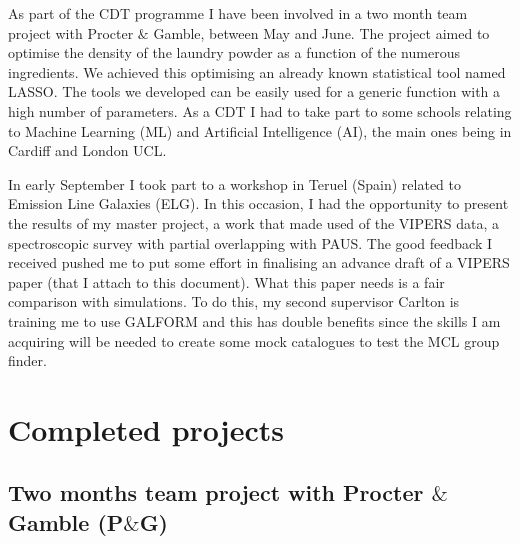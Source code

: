 \documentclass[letterpaper]{article}
\begin{document}
As part of the CDT programme I have been involved in a two month team project with Procter $\&$ Gamble, between May and June. The project aimed to optimise the density of the laundry powder as a function of the numerous ingredients. We achieved this optimising an already known statistical tool named LASSO. The tools we developed can be easily used for a generic function with a high number of parameters. As a CDT I had to take part to some schools relating to Machine Learning (ML) and Artificial Intelligence (AI), the main ones being in Cardiff and London UCL.

In early September I took part to a workshop in Teruel (Spain) related to Emission Line Galaxies (ELG). In this occasion, I had the opportunity to present the results of my master project, a work that made used of the VIPERS data, a spectroscopic survey with partial overlapping with PAUS. The good feedback I received pushed me to put some effort in finalising an advance draft of a VIPERS paper (that I attach to this document). What this paper needs is a fair comparison with simulations. To do this, my second supervisor Carlton is training me to use GALFORM and this has double benefits since the skills I am acquiring will be needed to create some mock catalogues to test the MCL group finder.


\section{Completed projects}
\label{sec:complete}

\subsection{Two months team project with Procter $\&$ Gamble (P$\&$G)}
\label{sub:peg}
\end{document}
